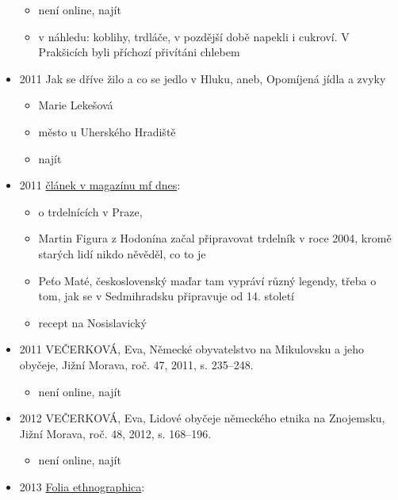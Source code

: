 \begin{itemize}
  \begin{itemize}
  \tightlist
  \item
    není online, najít
  \item
    v náhledu: koblihy, trdláče, v pozdější době napekli i cukroví. V
    Prakšicích byli příchozí přivítáni chlebem
  \end{itemize}
\item
  2011 Jak se dříve žilo a co se jedlo v Hluku, aneb, Opomíjená jídla a
  zvyky

  \begin{itemize}
  \tightlist
  \item
    Marie Lekešová
  \item
    město u Uherského Hradiště
  \item
    najít
  \end{itemize}
\item
  2011
  \href{https://ndk.cz/view/uuid:cc17ef80-fa5e-11e7-9854-5ef3fc9ae867?page=uuid\%3A5f880b20-fa6d-11e7-9854-5ef3fc9ae867}{článek
  v magazínu mf dnes}:

  \begin{itemize}
  \tightlist
  \item
    o trdelnících v Praze,
  \item
    Martin Figura z Hodonína začal připravovat trdelník v roce 2004,
    kromě starých lidí nikdo něvěděl, co to je
  \item
    Peťo Maté, československý maďar tam vypráví různý legendy, třeba o
    tom, jak se v Sedmihradsku připravuje od 14. století
  \item
    recept na Nosislavický
  \end{itemize}
\item
  2011 VEČERKOVÁ, Eva, Německé obyvatelstvo na Mikulovsku a jeho
  obyčeje, Jižní Morava, roč. 47, 2011, s. 235--248.

  \begin{itemize}
  \tightlist
  \item
    není online, najít
  \end{itemize}
\item
  2012 VEČERKOVÁ, Eva, Lidové obyčeje německého etnika na Znojemsku,
  Jižní Morava, roč. 48, 2012, s. 168--196.

  \begin{itemize}
  \tightlist
  \item
    není online, najít
  \end{itemize}
\item
  2013
  \href{https://ndk.cz/view/uuid:1b545920-4f78-11e4-a830-005056827e51?page=uuid:226078c0-5c34-11e4-a6f0-5ef3fc9ae867}{Folia
  ethnographica}:


\end{itemize}
